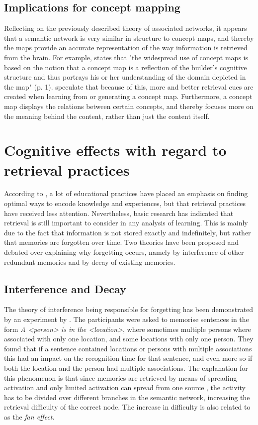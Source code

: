 \subsection{Implications for concept mapping}

Reflecting on the previously described theory of associated networks, it appears that a semantic network is very similar in structure to concept maps, and thereby the maps provide an accurate representation of the way information is retrieved from the brain. For example,  states that "the widespread use of concept maps is based on the notion that a concept map is a reflection of the builder's cognitive structure and thus portrays his or her understanding of the domain depicted in the map" (p. 1).  speculate that because of this, more and better retrieval cues are created when learning from or generating a concept map. Furthermore, a concept map displays the relations between certain concepts, and thereby focuses more on the meaning behind the content, rather than just the content itself.

\section{Cognitive effects with regard to retrieval practices}

According to , a lot of educational practices have placed an emphasis on finding optimal ways to encode knowledge and experiences, but that retrieval practices have received less attention. Nevertheless, basic research has indicated that retrieval is still important to consider in any analysis of learning. This is mainly due to the fact that information is not stored exactly and indefinitely, but rather that memories are forgotten over time. Two theories have been proposed and debated over explaining why forgetting occurs, namely by interference of other redundant memories and by decay of existing memories.

\subsection{Interference and Decay}

The theory of interference being responsible for forgetting has been demonstrated by an experiment by . The participants were asked to memorise sentences in the form \emph{A \textless person\textgreater{} is in the \textless location\textgreater}, where sometimes multiple persons where associated with only one location, and some locations with only one person. They found that if a sentence contained locations or persons with multiple associations this had an impact on the recognition time for that sentence, and even more so if both the location and the person had multiple associations. The explanation for this phenomenon is that since memories are retrieved by means of spreading activation and only limited activation can spread from one source \cite{cognitivepsychology}, the activity has to be divided over different branches in the semantic network, increasing the retrieval difficulty of the correct node. The increase in difficulty is also related to as the \emph{fan effect}.

